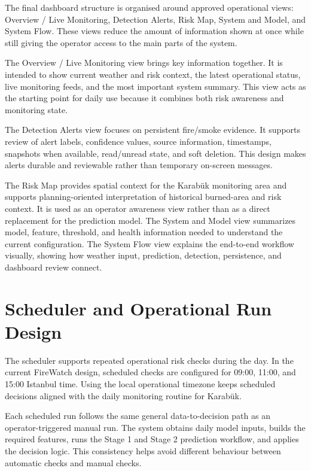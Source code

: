 The final dashboard structure is organised around approved operational views:
Overview / Live Monitoring, Detection Alerts, Risk Map, System and Model, and
System Flow. These views reduce the amount of information shown at once while
still giving the operator access to the main parts of the system.

The Overview / Live Monitoring view brings key information together. It is
intended to show current weather and risk context, the latest operational
status, live monitoring feeds, and the most important system summary. This
view acts as the starting point for daily use because it combines both risk
awareness and monitoring state.

The Detection Alerts view focuses on persistent fire/smoke evidence. It
supports review of alert labels, confidence values, source information,
timestamps, snapshots when available, read/unread state, and soft deletion.
This design makes alerts durable and reviewable rather than temporary
on-screen messages.

The Risk Map provides spatial context for the Karabük monitoring area and
supports planning-oriented interpretation of historical burned-area and risk
context. It is used as an operator awareness view rather than as a direct
replacement for the prediction model. The System and Model view summarizes
model, feature, threshold, and health information needed to understand the
current configuration. The System Flow view explains the end-to-end workflow
visually, showing how weather input, prediction, detection, persistence, and
dashboard review connect.

\section{Scheduler and Operational Run Design}

The scheduler supports repeated operational risk checks during the day. In the
current FireWatch design, scheduled checks are configured for 09:00, 11:00,
and 15:00 Istanbul time. Using the local operational timezone keeps scheduled
decisions aligned with the daily monitoring routine for Karabük.

Each scheduled run follows the same general data-to-decision path as an
operator-triggered manual run. The system obtains daily model inputs, builds
the required features, runs the Stage 1 and Stage 2 prediction workflow, and
applies the decision logic. This consistency helps avoid different behaviour
between automatic checks and manual checks.

